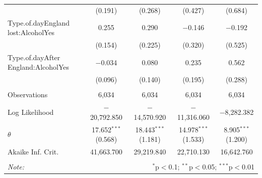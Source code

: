 \documentclass[12pt, letterpaper]{article}
\begin{document}
\begin{table}
{\begin{tabular}{@{\extracolsep{5pt}}lcccc}
  & (0.191) & (0.268) & (0.427) & (0.684) \\ 
  Type.of.dayEngland lost:AlcoholYes & 0.255 & 0.290 & $-$0.146 & $-$0.192 \\ 
  & (0.154) & (0.225) & (0.320) & (0.525) \\ 
  Type.of.dayAfter England:AlcoholYes & $-$0.034 & 0.080 & 0.235 & 0.562 \\ 
  & (0.096) & (0.140) & (0.195) & (0.288) \\ 
 \hline \\[-1.8ex] 
Observations & 6,034 & 6,034 & 6,034 & 6,034 \\ 
Log Likelihood & $-$20,792.850 & $-$14,570.920 & $-$11,316.060 & $-$8,282.382 \\ 
$\theta$ & 17.652$^{***}$  (0.568) & 18.443$^{***}$  (1.181) & 14.978$^{***}$  (1.533) & 8.905$^{***}$  (1.200) \\ 
Akaike Inf. Crit. & 41,663.700 & 29,219.840 & 22,710.130 & 16,642.760 \\ 
\hline 
\hline \\[-1.8ex] 
\textit{Note:}  & \multicolumn{4}{r}{$^{*}$p$<$0.1; $^{**}$p$<$0.05; $^{***}$p$<$0.01} \\ 
\end{tabular} }
\end{table}

\newpage
\end{document}

